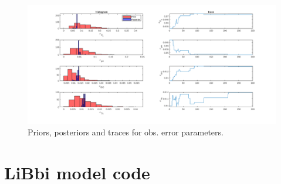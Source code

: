 \documentclass{ruthesis}
\begin{document}
\begin{figure}
	\centerline{\includegraphics[width=1.3\textwidth]{images_microalgae/plots/parameters_obserror}}
	\caption[.]{Priors, posteriors and traces for obs. error parameters.}
	\label{fig:pos_parameters_obserror}
\end{figure}



\appendix

\chapter{LiBbi model code}\label{appendix_micro_libbi_code}
\end{document}

